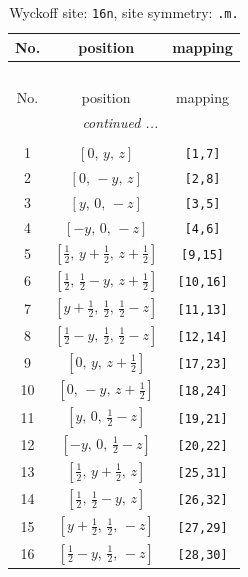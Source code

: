 \documentclass[fleqn,8pt]{jsarticle}
\begin{document}
\renewcommand{\arraystretch}{1.2}
\begin{longtable}{ccc}
\caption{Wyckoff site: {\tt 16n}, site symmetry: {\tt .m.}}
 \\
 \hline \hline
No. & position & mapping \\ \hline \endfirsthead

\multicolumn{2}{l}{\tablename\ \thetable{}} \\
 \hline \hline
No. & position & mapping \\ \hline \endhead

 \hline \hline
\multicolumn{2}{r}{\footnotesize\it continued ...} \\ \endfoot

 \hline \hline
\multicolumn{2}{r}{} \\ \endlastfoot

1 & $\left[ 0,\, y,\, z \right]$ & {\tt [1,7]} \\ \hline
2 & $\left[ 0,\, - y,\, z \right]$ & {\tt [2,8]} \\ \hline
3 & $\left[ y,\, 0,\, - z \right]$ & {\tt [3,5]} \\ \hline
4 & $\left[ - y,\, 0,\, - z \right]$ & {\tt [4,6]} \\ \hline
5 & $\left[ \frac{1}{2},\, y + \frac{1}{2},\, z + \frac{1}{2} \right]$ & {\tt [9,15]} \\ \hline
6 & $\left[ \frac{1}{2},\, \frac{1}{2} - y,\, z + \frac{1}{2} \right]$ & {\tt [10,16]} \\ \hline
7 & $\left[ y + \frac{1}{2},\, \frac{1}{2},\, \frac{1}{2} - z \right]$ & {\tt [11,13]} \\ \hline
8 & $\left[ \frac{1}{2} - y,\, \frac{1}{2},\, \frac{1}{2} - z \right]$ & {\tt [12,14]} \\ \hline
9 & $\left[ 0,\, y,\, z + \frac{1}{2} \right]$ & {\tt [17,23]} \\ \hline
10 & $\left[ 0,\, - y,\, z + \frac{1}{2} \right]$ & {\tt [18,24]} \\ \hline
11 & $\left[ y,\, 0,\, \frac{1}{2} - z \right]$ & {\tt [19,21]} \\ \hline
12 & $\left[ - y,\, 0,\, \frac{1}{2} - z \right]$ & {\tt [20,22]} \\ \hline
13 & $\left[ \frac{1}{2},\, y + \frac{1}{2},\, z \right]$ & {\tt [25,31]} \\ \hline
14 & $\left[ \frac{1}{2},\, \frac{1}{2} - y,\, z \right]$ & {\tt [26,32]} \\ \hline
15 & $\left[ y + \frac{1}{2},\, \frac{1}{2},\, - z \right]$ & {\tt [27,29]} \\ \hline
16 & $\left[ \frac{1}{2} - y,\, \frac{1}{2},\, - z \right]$ & {\tt [28,30]} \\
\end{longtable}
\end{document}
